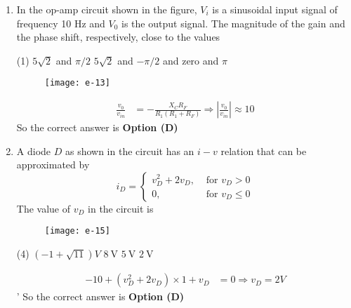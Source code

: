 \begin{enumerate}
\begin{answer}
\end{answer}
	\item In the op-amp circuit shown in the figure, $V_{i}$ is a sinusoidal input signal of frequency 10 $\mathrm{Hz}$ and $V_{0}$ is the output signal. The magnitude of the gain and the phase shift, respectively, close to the values
{	}
\begin{minipage}{0.45\textwidth}
\begin{tasks}(1)
	\task[\textbf{A.}] $5 \sqrt{2}$ and $\pi / 2$
	\task[\textbf{B.}] $5 \sqrt{2}$ and $-\pi / 2$
	 and zero
	 and $\pi$
\end{tasks}
\end{minipage}
\begin{minipage}{0.45\textwidth}
\begin{figure}[H]
	\centering
	\texttt{[image: e-13]}
\end{figure}
\end{minipage}
\begin{answer}
\begin{align*}
\frac{v_{0}}{v_{i n}}
&=-\frac{X_{C} R_{F}}{R_{1}\left(R_{1}+R_{F}\right)} \Rightarrow\left|\frac{v_{0}}{v_{i n}}\right| \approx 10
\end{align*}
So the correct answer is \textbf{Option (D)}
\end{answer}
	\item A diode $D$ as shown in the circuit has an $i-v$ relation that can be approximated by
	$$i_{D}=\left\{\begin{array}{ll}v_{D}^{2}+2 v_{D}, & \text { for } v_{D}>0 \\ 0, & \text { for } v_{D} \leq 0\end{array}\right.$$
	The value of $v_{D}$ in the circuit is
{	}
\begin{figure}[H]
\centering
\texttt{[image: e-15]}
\end{figure}
\begin{tasks}(4)
\task[\textbf{A.}] $(-1+\sqrt{11}) V$
\task[\textbf{B.}] $8 \mathrm{~V}$
\task[\textbf{C.}] $5 \mathrm{~V}$
\task[\textbf{D.}] $2 \mathrm{~V}$
\end{tasks}
\begin{answer}
\begin{align*}
-10+\left(v_{D}^{2}+2 v_{D}\right) \times 1+v_{D}&=0 \Rightarrow v_{D}=2 V
\end{align*}'
So the correct answer is \textbf{Option (D)}
\end{answer}

\end{enumerate}
